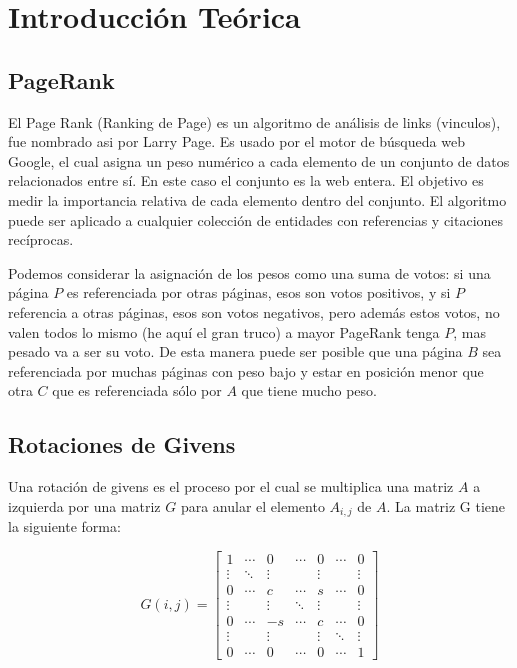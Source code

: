 \section{Introducción Teórica}

\subsection{PageRank}

El Page Rank (Ranking de Page) es un algoritmo de análisis de links (vinculos),
fue nombrado asi por Larry Page. Es usado por el motor de búsqueda web Google,
el cual asigna un peso numérico a cada elemento de un conjunto de datos
relacionados entre sí. En este caso el conjunto es la web entera. El objetivo es
medir la importancia relativa de cada elemento dentro del conjunto. El algoritmo
puede ser aplicado a cualquier colección de entidades con referencias y
citaciones recíprocas.

Podemos considerar la asignación de los pesos como una suma de votos: si una
página $P$ es referenciada por otras páginas, esos son votos positivos, y si $P$
referencia a otras páginas, esos son votos negativos, pero además estos votos,
no valen todos lo mismo (he aquí el gran truco) a mayor PageRank tenga $P$, mas
pesado va a ser su voto. De esta manera puede ser posible que una página $B$ sea
referenciada por muchas páginas con peso bajo y estar en posición menor que otra
$C$ que es referenciada sólo por $A$ que tiene mucho peso.

\subsection{Rotaciones de Givens}

Una rotación de givens es el proceso por el cual se multiplica una matriz $A$ a izquierda por una matriz $G$ para anular el elemento $A_{i, j}$ de $A$.
La matriz G tiene la siguiente forma:

\begin{displaymath}
G(i, j) =
\begin{bmatrix}
1	& \cdots &    0   & \cdots &    0   & \cdots &    0   \\
\vdots	& \ddots & \vdots &        & \vdots &        & \vdots \\
0	& \cdots &    c   & \cdots &    s   & \cdots &    0   \\
\vdots	&        & \vdots & \ddots & \vdots &        & \vdots \\
0	& \cdots &   -s   & \cdots &    c   & \cdots &    0   \\
\vdots	&        & \vdots &        & \vdots & \ddots & \vdots \\
0	& \cdots &    0   & \cdots &    0   & \cdots &    1
\end{bmatrix}
\end{displaymath}

